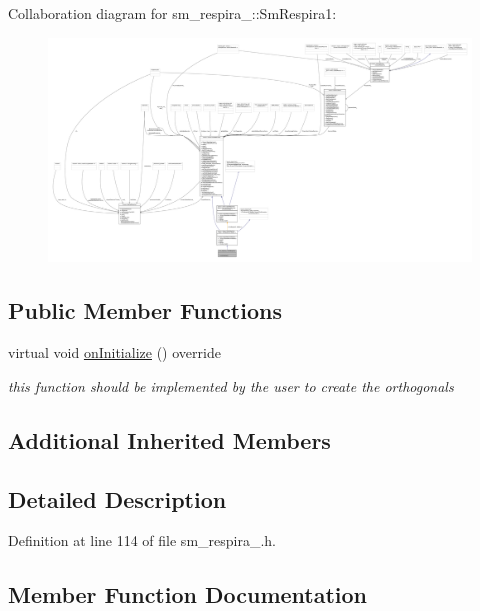 Collaboration diagram for sm\+\_\+respira\+\_\+:\+:Sm\+Respira1\+:
\nopagebreak
\begin{figure}[H]
\begin{center}
\leavevmode
\includegraphics[width=350pt]{structsm__respira__1_1_1SmRespira1__coll__graph}
\end{center}
\end{figure}
\subsection*{Public Member Functions}
\begin{DoxyCompactItemize}
\item 
virtual void \hyperlink{structsm__respira__1_1_1SmRespira1_a6be26eb018ef73a2e39772fe4a03e551}{on\+Initialize} () override
\begin{DoxyCompactList}\small\item\em this function should be implemented by the user to create the orthogonals \end{DoxyCompactList}\end{DoxyCompactItemize}
\subsection*{Additional Inherited Members}


\subsection{Detailed Description}


Definition at line 114 of file sm\+\_\+respira\+\_.\+h.



\subsection{Member Function Documentation}
\mbox{\label{structsm__respira__1_1_1SmRespira1_a6be26eb018ef73a2e39772fe4a03e551}} 
